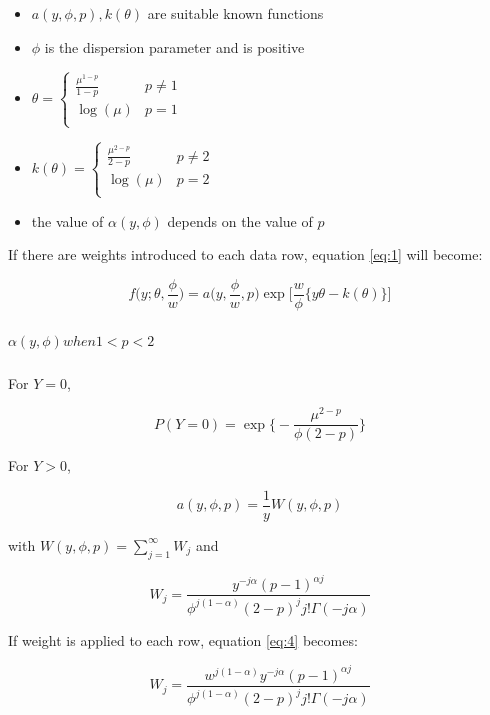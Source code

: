 \begin{itemize}
\item $a (y, \phi, p), k(\theta)$ are suitable known functions
\item $\phi$ is the dispersion parameter and is positive
\item $\theta = \begin{cases} \frac{\mu ^{1-p}}{1-p} & p \neq 1 \\ \log (\mu) & p = 1 \\\end{cases}$
\item $k(\theta) = \begin{cases} \frac{\mu ^{2-p}}{2-p} & p \neq 2 \\ \log (\mu) & p=2 \\\end{cases}$
\item the value of $\alpha (y,\phi)$ depends on the value of $p$
\end{itemize}

If there are weights introduced to each data row, equation \ref{eq:1} will become:

$$f \Big( y; \theta, \frac{\phi}{w} \Big) = a \Big( y, \frac{\phi}{w}, p \Big) \exp \Big[ \frac{w}{\phi} \big\{ y\theta - k(\theta) \big\} \Big]$$

\subparagraph{$\alpha (y, \phi) when 1<p<2$}

For $Y=0$,

\begin{equation} \label{eq:2}
P(Y=0) = \exp \Big\{-\frac{\mu^{2-p}}{\phi (2-p)} \Big\}
\end{equation}

For $Y>0$,

\begin{equation} \label{eq:3}
a(y, \phi, p) = \frac{1}{y} W(y, \phi, p)
\end{equation}

with $W(y, \phi, p) = \sum^{\infty}_{j=1} W_j$ and 

\begin{equation} \label{eq:4}
W_j = \frac{y^{-j \alpha}(p-1)^{\alpha j}}{\phi^{j(1-\alpha)} (2-p)^j j!\Gamma(-j\alpha)}
\end{equation}

If weight is applied to each row, equation \ref{eq:4} becomes:

\begin{equation} \label{eq:5}
W_j = \frac{w^{j(1-\alpha)}y^{-j \alpha}(p-1)^{\alpha j}}{\phi^{j(1-\alpha)}(2-p)^j j!\Gamma(-j \alpha)}
\end{equation}

